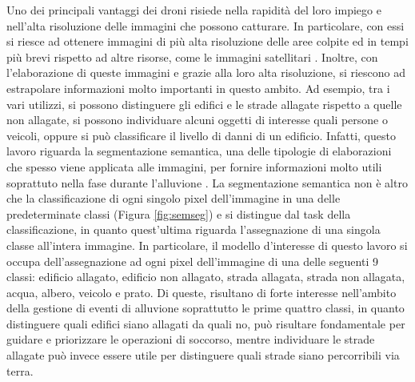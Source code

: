 Uno dei principali vantaggi dei droni risiede nella rapidità del loro impiego e nell’alta risoluzione delle immagini che possono catturare. In particolare, con essi si riesce ad ottenere immagini di più alta risoluzione delle aree colpite ed in tempi più brevi rispetto ad altre risorse, come le immagini satellitari \cite{flyhurricane}. Inoltre, con l’elaborazione di queste immagini e grazie alla loro alta risoluzione, si riescono ad estrapolare informazioni molto importanti in questo ambito. Ad esempio, tra i vari utilizzi, si possono distinguere gli edifici e le strade allagate rispetto a quelle non allagate, si possono individuare alcuni oggetti di interesse quali persone o veicoli, oppure si può classificare il livello di danni di un edificio. Infatti, questo lavoro riguarda la segmentazione semantica, una delle tipologie di elaborazioni che spesso viene applicata alle immagini, per fornire informazioni molto utili soprattuto nella fase durante l'alluvione \cite{semsegsurvey}. La segmentazione semantica non è altro che la classificazione di ogni singolo pixel dell’immagine in una delle predeterminate classi (Figura \ref{fig:semseg})  e si distingue dal task della classificazione, in quanto quest’ultima riguarda l’assegnazione di una singola classe all’intera immagine. In particolare, il modello d’interesse di questo lavoro si occupa dell’assegnazione ad ogni pixel dell’immagine di una delle seguenti 9 classi: edificio allagato, edificio non allagato, strada allagata, strada non allagata, acqua, albero, veicolo e prato. Di queste, risultano di forte interesse nell'ambito della gestione di eventi di alluvione soprattutto le prime quattro classi, in quanto distinguere quali edifici siano allagati da quali no, può risultare fondamentale per guidare e priorizzare le operazioni di soccorso, mentre individuare le strade allagate può invece essere utile per distinguere quali strade siano percorribili via terra.

